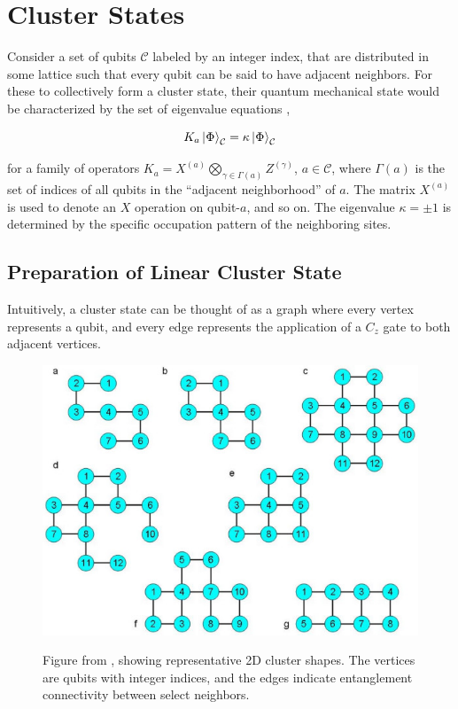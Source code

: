 \documentclass[twocolumn]{Styles/IEEEtran11}
\begin{document}
\section{Cluster States}
Consider a set of qubits $\mathcal{C}$ labeled by an integer index, that are distributed in some lattice such that every qubit can be said to have adjacent neighbors. For these to collectively form a cluster state, their quantum mechanical state would be characterized by the set of eigenvalue equations \cite{briegel2001persistent},

\begin{equation}
  K_a\left|\mspace{0.5mu} \Phi \mspace{0.5mu}\right\rangle_{\mathcal{C}}= \kappa\left|\mspace{0.5mu} \Phi \mspace{0.5mu}\right\rangle_{\mathcal{C}}\label{eq1}
\end{equation}

\noindent for a family of operators $K_a = X^{(a)}\bigotimes_{\gamma\in\Gamma(a)}Z^{(\gamma)}$, $a\in\mathcal{C}$, where $\Gamma(a)$ is the set of indices of all qubits in the ``adjacent neighborhood'' of $a$. The matrix $X^{(a)}$ is used to denote an $X$ operation on qubit-$a$, and so on. The eigenvalue $\kappa = \pm 1$ is determined by the specific occupation pattern of the neighboring sites. 

\subsection{Preparation of Linear Cluster State}


Intuitively, a cluster state can be thought of as a graph
where every vertex represents a qubit, and every edge represents the
application of a $C_z$ gate to both adjacent vertices.

\begin{figure}[thb]
  \centering
  \includegraphics[width=0.9\linewidth]{Images/2d_clusters_rep.jpg}
  \label{I2dclustersfig}
  \caption{Figure from \protect\cite{gerald2006efficient}, showing representative 2D cluster shapes. The vertices are qubits with integer indices, and the edges indicate entanglement connectivity between select neighbors.}
\end{figure}
\end{document}
